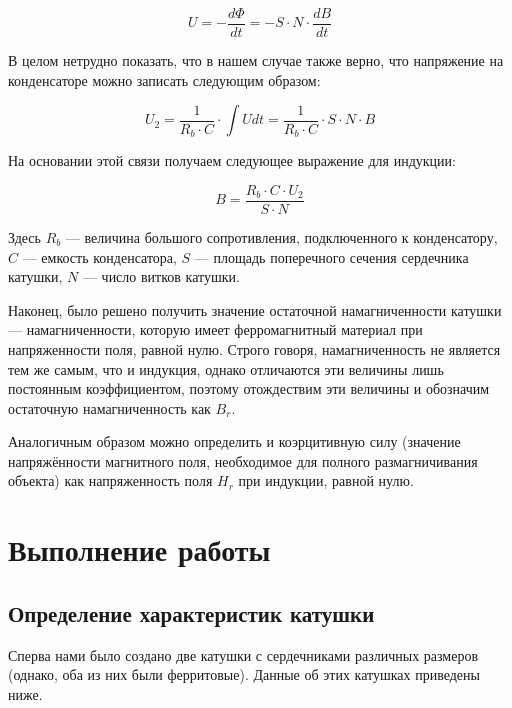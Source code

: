 \documentclass[a4paper, 12pt]{article}
\begin{document}
\begin{equation}
	\label{eq:faradey}
	U = -\frac{d\Phi}{dt} = - S \cdot N \cdot \frac{dB}{dt}
\end{equation}

В целом нетрудно показать, что в нашем случае также верно, что напряжение на конденсаторе можно записать следующим образом:

\begin{equation}
	\label{eq:Ucap}
	U_2 = \frac{1}{R_b\cdot C} \cdot \int U dt = \frac{1}{R_b \cdot C}\cdot S \cdot N \cdot B
\end{equation}

На основании этой связи получаем следующее выражение для индукции:

\begin{equation}
	\label{eq:B}
	B = \frac{R_b \cdot C \cdot U_2}{S \cdot N}
\end{equation}

Здесь $R_b$ --- величина большого сопротивления, подключенного к конденсатору, $C$ --- емкость конденсатора, $S$ --- площадь поперечного сечения сердечника катушки, $N$ --- число витков катушки. 

Наконец, было решено получить значение остаточной намагниченности катушки --- намагниченности, которую имеет ферромагнитный материал при напряженности поля, равной нулю. Строго говоря, намагниченность не является тем же самым, что и индукция, однако отличаются эти величины лишь постоянным коэффициентом, поэтому отождествим эти величины и обозначим остаточную намагниченность как $B_r$.

Аналогичным образом можно определить и коэрцитивную силу (значение напряжённости магнитного поля, необходимое для полного размагничивания объекта) как напряженность поля $H_r$ при индукции, равной нулю.


\section{Выполнение работы}

\subsection{Определение характеристик катушки}

Сперва нами было создано две катушки с сердечниками различных размеров (однако, оба из них были ферритовые). Данные об этих катушках приведены ниже.
\end{document}
